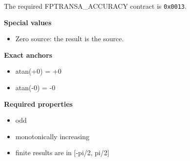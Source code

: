 The required FPTRANSA\_ACCURACY contract is \texttt{0x0013}.

\textbf{Special values}\par
\begin{itemize}
\item Zero source: the result is the source.
\end{itemize}

\textbf{Exact anchors}\par
\begin{itemize}
\item atan(+0) = +0
\item atan(-0) = -0
\end{itemize}

\textbf{Required properties}\par
\begin{itemize}
\item odd
\item monotonically increasing
\item finite results are in [-pi/2, pi/2]
\end{itemize}
